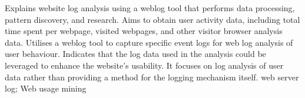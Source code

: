 {
    Explains website log analysis using a weblog tool that performs data processing, pattern discovery, and research. Aims to obtain user activity data, including total time spent per webpage, visited webpages, and other visitor browser analysis data.
}
{
    Utilises a weblog tool to capture specific event logs for web log analysis of user behaviour.
}
{
    Indicates that the log data used in the analysis could be leveraged to enhance the website's usability.
}
{
    It focuses on log analysis of user data rather than providing a method for the logging mechanism itself.
}
{
    web server log; Web usage mining
}